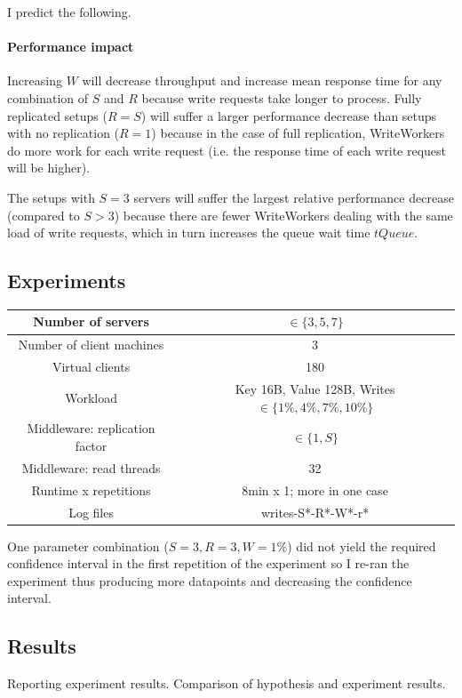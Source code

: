 \documentclass[11pt]{article}
\begin{document}
I predict the following.

\paragraph{Performance impact}
Increasing $W$ will decrease throughput and increase mean response time for any combination of $S$ and $R$ because write requests take longer to process. Fully replicated setups ($R=S$) will suffer a larger performance decrease than setups with no replication ($R=1$) because in the case of full replication, WriteWorkers do more work for each write request (i.e. the response time of each write request will be higher).

The setups with $S=3$ servers will suffer the largest relative performance decrease (compared to $S > 3$) because there are fewer WriteWorkers dealing with the same load of write requests, which in turn increases the queue wait time $tQueue$.

\subsection{Experiments}
\begin{center}
\small{
\smallskip
\begin{tabular}{|c|c|}
\hline Number of servers & $\in \{3, 5, 7\}$ \\ 
\hline Number of client machines & 3 \\ 
\hline Virtual clients & 180 \\ 
\hline Workload & Key 16B, Value 128B, Writes $\in \{1\%, 4\%, 7\%, 10\%\}$ \\
\hline Middleware: replication factor & $\in \{1, S\}$ \\ 
\hline Middleware: read threads & 32 \\ 
\hline Runtime x repetitions & 8min x 1; more in one case \\ 
\hline Log files & writes-S*-R*-W*-r* \\
\hline 
\end{tabular} }
\end{center}

One parameter combination ($S=3, R=3, W=1\%$) did not yield the required confidence interval in the first repetition of the experiment so I re-ran the experiment thus producing more datapoints and decreasing the confidence interval.

\subsection{Results}
Reporting experiment results. Comparison of hypothesis and experiment results.
\end{document}
